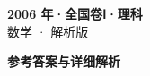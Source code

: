 \documentclass[zihao=-4, a4paper]{ctexart}
\begin{document}
\begin{center}
  {\Large\bfseries 2006 年·全国卷Ⅰ·理科}\\[4pt]
  {\large 数学 · 解析版}
\end{center}
\medskip
{}

\clearpage
{}
\begin{center}{\Large\bfseries 参考答案与详细解析}\end{center}
\medskip

\end{document}
